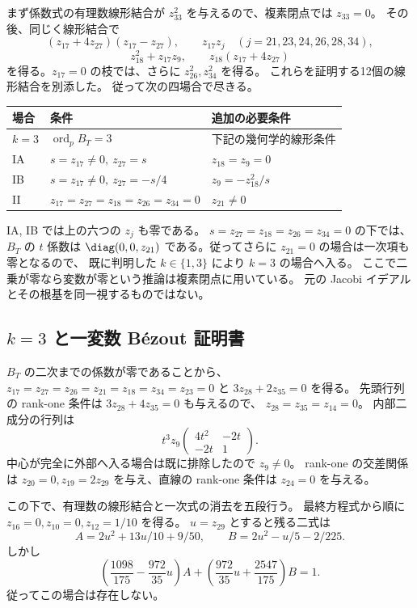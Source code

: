まず係数式の有理数線形結合が $z_{33}^2$ を与えるので、複素閉点では $z_{33}=0$。
その後、同じく線形結合で
\[
 (z_{17}+4z_{27})(z_{17}-z_{27}),\qquad
 z_{17}z_j\quad(j=21,23,24,26,28,34),
\]
\[
 z_{18}^2+z_{17}z_9,\qquad z_{18}(z_{17}+4z_{27})
\]
を得る。$z_{17}=0$ の枝では、さらに $z_{26}^2,z_{34}^2$ を得る。
これらを証明する12個の線形結合を別添した。
従って次の四場合で尽きる。

\begin{center}\small
\begin{tabular}{@{}lll@{}}\toprule
場合 & 条件 & 追加の必要条件\\\midrule
$k=3$ & $\operatorname{ord}_pB_T=3$ & 下記の幾何学的線形条件\\
IA & $s=z_{17}\ne0,\ z_{27}=s$ & $z_{18}=z_9=0$\\
IB & $s=z_{17}\ne0,\ z_{27}=-s/4$ & $z_9=-z_{18}^2/s$\\
II & $z_{17}=z_{27}=z_{18}=z_{26}=z_{34}=0$ & $z_{21}\ne0$\\\bottomrule
\end{tabular}\end{center}
IA, IB では上の六つの $z_j$ も零である。
$s=z_{27}=z_{18}=z_{26}=z_{34}=0$ の下では、$B_T$ の $t$ 係数は
$\diag(0,0,z_{21})$ である。従ってさらに $z_{21}=0$ の場合は一次項も零となるので、
既に判明した $k\in\{1,3\}$ により $k=3$ の場合へ入る。
ここで二乗が零なら変数が零という推論は複素閉点に用いている。
元の Jacobi イデアルとその根基を同一視するものではない。

\subsection{\texorpdfstring{$k=3$}{k=3} と一変数 B\'ezout 証明書}
$B_T$ の二次までの係数が零であることから、
$z_{17}=z_{27}=z_{26}=z_{21}=z_{18}=z_{34}=z_{23}=0$ と $3z_{28}+2z_{35}=0$ を得る。
先頭行列の rank-one 条件は $3z_{28}+4z_{35}=0$ も与えるので、
$z_{28}=z_{35}=z_{14}=0$。
内部二成分の行列は
\[
 t^3z_9\begin{pmatrix}4t^2&-2t\\-2t&1\end{pmatrix}.
\]
中心が完全に外部へ入る場合は既に排除したので $z_9\ne0$。
rank-one の交差関係は $z_{20}=0,z_{19}=2z_{29}$ を与え、直線の rank-one 条件は
$z_{24}=0$ を与える。

この下で、有理数の線形結合と一次式の消去を五段行う。
最終方程式から順に $z_{16}=0,z_{10}=0,z_{12}=1/10$ を得る。
$u=z_{29}$ とすると残る二式は
\[
 A=2u^2+13u/10+9/50,\qquad
 B=2u^2-u/5-2/225.
\]
しかし
\[
 \left(\frac{1098}{175}-\frac{972}{35}u\right)A+
 \left(\frac{972}{35}u+\frac{2547}{175}\right)B=1.
\]
従ってこの場合は存在しない。

